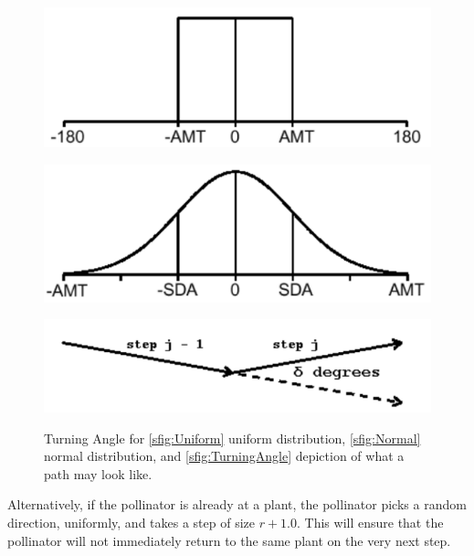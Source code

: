 \begin{figure}[h!]
  \begin{center}
    \begin{minipage}[b]{0.48\textwidth}
      \includegraphics[scale=0.4]{UniformTADistribution.pdf}
       \label{sfig:Uniform}
    \end{minipage}
    \begin{minipage}[b]{0.48\textwidth}
      \includegraphics[scale=0.4]{NormalTADistribution.pdf}
       \label{sfig:Normal}
    \end{minipage}
    \includegraphics[scale=0.5]{TurningAngle.pdf}
     \label{sfig:TurningAngle}
  \end{center}
  \caption{Turning Angle for \ref{sfig:Uniform} uniform distribution,
  \ref{sfig:Normal} normal distribution, and \ref{sfig:TurningAngle} depiction
  of what a path may look like.}\label{fig:TurningAngle}
\end{figure}

Alternatively, if the pollinator is already at a plant, the pollinator picks a
random direction, uniformly, and takes a step of size $r+1.0$.  This will ensure
that the pollinator will not immediately return to the same plant on the very
next step.

